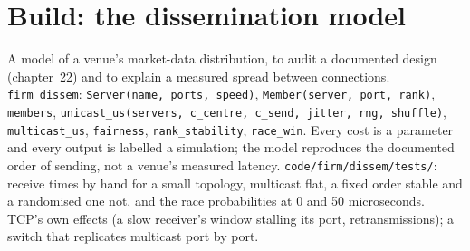 \begin{omfigure}

\label{fig:nw:the-asia-pacific-map:sorted}
\end{omfigure}

\section{Build: the dissemination model}\label{bld:nw:the-asia-pacific-map:dissem}

\begin{build}
 A model of a venue's market-data distribution, to audit a documented design (chapter~22) and to explain a measured spread
between connections.
 \texttt{firm\_dissem}: \texttt{Server(name, ports, speed)}, \texttt{Member(server, port, rank)}, \texttt{members},
\texttt{unicast\_us(servers, c\_centre, c\_send, jitter, rng, shuffle)}, \texttt{multicast\_us}, \texttt{fairness}, \texttt{rank\_stability},
\texttt{race\_win}.
 Every cost is a parameter and every output is labelled a simulation; the model reproduces the documented order of sending, not a
venue's measured latency.
 \texttt{code/firm/dissem/tests/}: receive times by hand for a small topology, multicast flat, a fixed order stable
and a randomised one not, and the race probabilities at 0 and 50 microseconds.
 TCP's own effects (a slow receiver's window stalling its port, retransmissions); a switch that replicates multicast port by
port.
\end{build}

